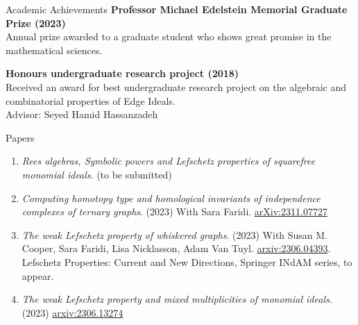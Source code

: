 \documentclass{resume} %
\begin{document}


\begin{rSection}{Academic Achievements}
{\bf Professor Michael Edelstein Memorial Graduate Prize (2023)}
\\
Annual prize awarded to a graduate student who shows great promise in the mathematical sciences. 


{\bf Honours undergraduate research project (2018)}
\\
Received an award for best undergraduate research project on the algebraic and combinatorial properties of Edge Ideals.
\\
Advisor: Seyed Hamid Hassanzadeh
\end{rSection}

\begin{rSection}{Papers}

\begin{enumerate}
    \item \textit{Rees algebras, Symbolic powers and Lefschetz properties of squarefree monomial ideals}. (to be submitted)
    \item \textit{Computing homotopy type and homological invariants of independence complexes of ternary graphs}. (2023) With Sara Faridi.  \href{https://arxiv.org/abs/2311.07727}{arXiv:2311.07727} %
    \item \textit{The weak Lefschetz property of whiskered graphs}. (2023) With Susan M. Cooper, Sara Faridi, Lisa Nicklasson, Adam Van Tuyl.  \href{https://arxiv.org/abs/2306.04393}{arxiv:2306.04393}. Lefschetz Properties: Current and New Directions, Springer INdAM series, to appear. 
    \item \textit{The weak Lefschetz property and mixed multiplicities of monomial ideals}. (2023) \href{https://arxiv.org/abs/2306.13274}{arxiv:2306.13274} %
\end{enumerate}
\end{rSection}
\end{document}
